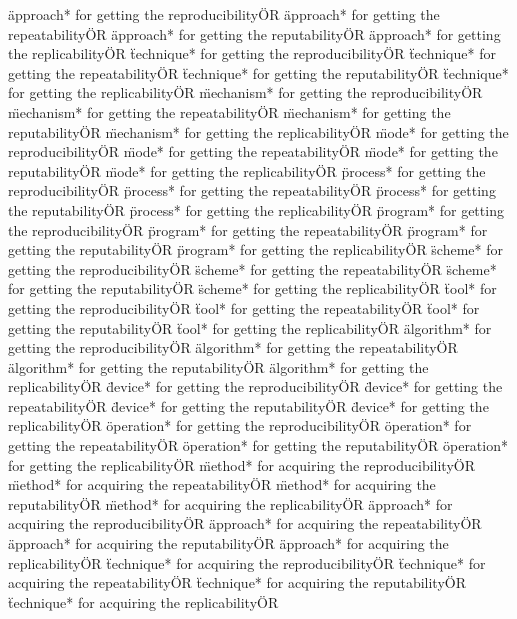 \documentclass[
10pt, %
a4paper, %
oneside, %
headinclude,footinclude, %
BCOR5mm, %
]{scrartcl}
\begin{document}
\"approach* for getting the reproducibility\" OR \"approach* for getting the repeatability\" OR \"approach* for getting the reputability\" OR \"approach* for getting the replicability\" OR 
\"technique* for getting the reproducibility\" OR \"technique* for getting the repeatability\" OR \"technique* for getting the reputability\" OR \"technique* for getting the replicability\" OR 
\"mechanism* for getting the reproducibility\" OR \"mechanism* for getting the repeatability\" OR \"mechanism* for getting the reputability\" OR \"mechanism* for getting the replicability\" OR 
\"mode* for getting the reproducibility\" OR \"mode* for getting the repeatability\" OR \"mode* for getting the reputability\" OR \"mode* for getting the replicability\" OR 
\"process* for getting the reproducibility\" OR \"process* for getting the repeatability\" OR \"process* for getting the reputability\" OR \"process* for getting the replicability\" OR 
\"program* for getting the reproducibility\" OR \"program* for getting the repeatability\" OR \"program* for getting the reputability\" OR \"program* for getting the replicability\" OR 
\"scheme* for getting the reproducibility\" OR \"scheme* for getting the repeatability\" OR \"scheme* for getting the reputability\" OR \"scheme* for getting the replicability\" OR 
\"tool* for getting the reproducibility\" OR \"tool* for getting the repeatability\" OR \"tool* for getting the reputability\" OR \"tool* for getting the replicability\" OR 
\"algorithm* for getting the reproducibility\" OR \"algorithm* for getting the repeatability\" OR \"algorithm* for getting the reputability\" OR \"algorithm* for getting the replicability\" OR 
\"device* for getting the reproducibility\" OR \"device* for getting the repeatability\" OR \"device* for getting the reputability\" OR \"device* for getting the replicability\" OR 
\"operation* for getting the reproducibility\" OR \"operation* for getting the repeatability\" OR \"operation* for getting the reputability\" OR \"operation* for getting the replicability\" OR 
\"method* for acquiring the reproducibility\" OR \"method* for acquiring the repeatability\" OR \"method* for acquiring the reputability\" OR \"method* for acquiring the replicability\" OR 
\"approach* for acquiring the reproducibility\" OR \"approach* for acquiring the repeatability\" OR \"approach* for acquiring the reputability\" OR \"approach* for acquiring the replicability\" OR 
\"technique* for acquiring the reproducibility\" OR \"technique* for acquiring the repeatability\" OR \"technique* for acquiring the reputability\" OR \"technique* for acquiring the replicability\" OR 
\end{document}
